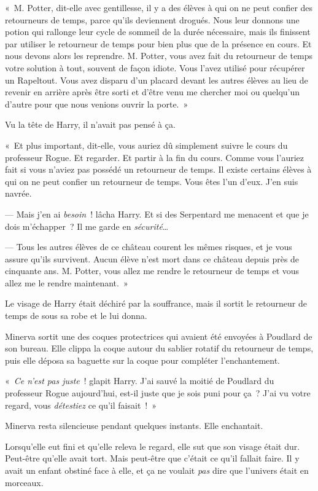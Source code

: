 «~M. Potter, dit-elle avec gentillesse, il y a des élèves à qui on ne peut confier des retourneurs de temps, parce qu'ils deviennent drogués.
Nous leur donnons une potion qui rallonge leur cycle de sommeil de la durée nécessaire, mais ils finissent par utiliser le retourneur de temps pour bien plus que de la présence en cours.
Et nous devons alors les reprendre.
M. Potter, vous avez fait du retourneur de temps votre solution à tout, souvent de façon idiote.
Vous l'avez utilisé pour récupérer un Rapeltout.
Vous avez disparu d'un placard devant les autres élèves au lieu de revenir en arrière après être sorti et d'être venu me chercher moi ou quelqu'un d'autre pour que nous venions ouvrir la porte.~»

Vu la tête de Harry, il n'avait pas pensé à ça.

«~Et plus important, dit-elle, vous auriez dû simplement suivre le cours du professeur Rogue.
Et regarder.
Et partir à la fin du cours.
Comme vous l'auriez fait si vous n'aviez pas possédé un retourneur de temps.
Il existe certains élèves à qui on ne peut confier un retourneur de temps.
Vous êtes l'un d'eux.
J'en suis navrée.

--- Mais j'en ai \emph{besoin}~! lâcha Harry.
Et si des Serpentard me menacent et que je dois m'échapper~?
Il me garde en \emph{sécurité}…

--- Tous les autres élèves de ce château courent les mêmes risques, et je vous assure qu'ils survivent.
Aucun élève n'est mort dans ce château depuis près de cinquante ans.
M. Potter, vous allez me rendre le retourneur de temps et vous allez me le rendre maintenant.~»

Le visage de Harry était déchiré par la souffrance, mais il sortit le retourneur de temps de sous sa robe et le lui donna.

Minerva sortit une des coques protectrices qui avaient été envoyées à Poudlard de son bureau.
Elle clippa la coque autour du sablier rotatif du retourneur de temps, puis elle déposa sa baguette sur la coque pour compléter l'enchantement.

«~\emph{Ce n'est pas juste}~! glapit Harry.
J'ai sauvé la moitié de Poudlard du professeur Rogue aujourd'hui, est-il juste que je sois puni pour ça~?
J'ai vu votre regard, vous \emph{détestiez} ce qu'il faisait~!~»

Minerva resta silencieuse pendant quelques instants.
Elle enchantait.

Lorsqu'elle eut fini et qu'elle releva le regard, elle sut que son visage était dur.
Peut-être qu'elle avait tort.
Mais peut-être que c'était ce qu'il fallait faire.
Il y avait un enfant obstiné face à elle, et ça ne voulait \emph{pas} dire que l'univers était en morceaux.

